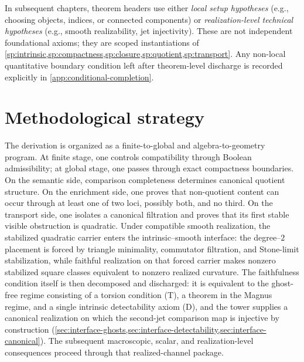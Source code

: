\begin{remark}
In subsequent chapters, theorem headers use either
\emph{local setup hypotheses} (e.g., choosing objects, indices, or
connected components) or \emph{realization-level technical hypotheses}
(e.g., smooth realizability, jet injectivity). These are not independent
foundational axioms; they are scoped instantiations of
\cref{sp:intrinsic,sp:compactness,sp:closure,sp:quotient,sp:transport}.
Any non-local quantitative boundary condition left after theorem-level
discharge is recorded explicitly in \cref{app:conditional-completion}.
\end{remark}

\section{Methodological strategy}
The derivation is organized as a finite-to-global and algebra-to-geometry
program.
At finite stage, one controls compatibility through Boolean admissibility;
at global stage, one passes through exact compactness boundaries.
On the semantic side, comparison completeness determines canonical
quotient structure.
On the enrichment side, one proves that non-quotient content can occur
through at least one of two loci, possibly both, and no third.
On the transport side, one isolates a canonical filtration and proves
that its first stable visible obstruction is quadratic.
Under compatible smooth realization, the stabilized quadratic carrier
enters the intrinsic--smooth interface: the degree--\(2\)
placement is forced by triangle minimality, commutator filtration, and
Stone-limit stabilization, while faithful realization on that forced
carrier makes nonzero stabilized square classes equivalent to nonzero
realized curvature.  The faithfulness condition itself is then
decomposed and discharged: it is equivalent to the ghost-free regime
consisting of a torsion condition \textup{(T)}, a theorem in the Magnus
regime, and a single intrinsic detectability axiom \textup{(D)}, and
the tower supplies a canonical realization on which the second-jet
comparison map is injective by construction
(\cref{sec:interface-ghosts,sec:interface-detectability,sec:interface-canonical}).
The subsequent macroscopic, scalar, and
realization-level consequences proceed through that realized-channel
package.

